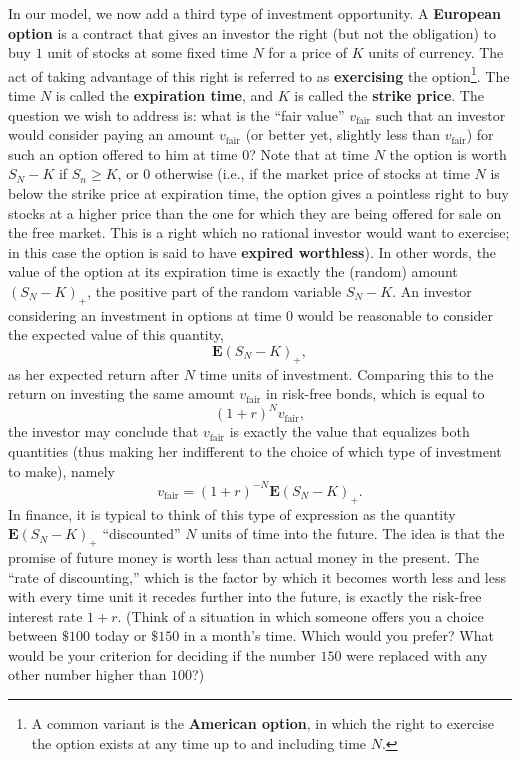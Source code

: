 \documentclass[12pt]{article}
\newcommand{\expec}{\mathbf{E}}
\theoremstyle{example}
\begin{document}
In our model, we now add a third type of investment opportunity. A \textbf{European option} is a contract that gives an investor the right (but not the obligation) to buy $1$ unit of stocks at some fixed time $N$ for a price of $K$ units of currency. The act of taking advantage of this right is referred to as \textbf{exercising} the option\footnote{A common variant is the \textbf{American option}, in which the right to exercise the option exists at any time up to and including time $N$.}. The time $N$ is called the \textbf{expiration time}, and $K$ is called the \textbf{strike price}. The question we wish to address is: what is the ``fair value'' $v_\textrm{fair}$ such that an investor would consider paying an amount $v_\textrm{fair}$ (or better yet, slightly less than $v_\textrm{fair}$) for such an option offered to him at time $0$? Note that at time $N$ the option is worth $S_N-K$ if $S_n\ge K$, or $0$ otherwise (i.e., if the market price of stocks at time $N$ is below the strike price at expiration time, the option gives a pointless right to buy stocks at a higher price than the one for which they are being offered for sale on the free market. This is a right which no rational investor would want to exercise; in this case the option is said to have \textbf{expired worthless}). In other words, the value of the option at its expiration time is exactly the (random) amount $(S_N-K)_+$, the positive part of the random variable $S_N-K$. An investor considering an investment in options at time $0$ would be reasonable to consider the expected value of this quantity,
$$ \expec(S_N-K)_+, $$
as her expected return after $N$ time units of investment. Comparing this to the return on investing the same amount $v_\textrm{fair}$ in risk-free bonds, which is equal to
$$ (1+r)^N v_\textrm{fair}, $$
the investor may conclude that $v_\textrm{fair}$ is exactly the value that equalizes both quantities (thus making her indifferent to the choice of which type of investment to make), namely
\begin{equation} \label{eq:discrete-black-scholes}
v_\textrm{fair} = (1+r)^{-N} \expec(S_N-K)_+.
\end{equation}
In finance, it is typical to think of this type of expression as the quantity $\expec(S_N-K)_+$ ``discounted'' $N$ units of time into the future. The idea is that the promise of future money is worth less than actual money in the present. The ``rate of discounting,'' which is the factor by which it becomes worth less and less with every time unit it recedes further into the future, is exactly the risk-free interest rate $1+r$. (Think of a situation in which someone offers you a choice between $\$100$ today or $\$150$ in a month's time. Which would you prefer? What would be your criterion for deciding if the number $150$ were replaced with any other number higher than $100$?)
\end{document}
